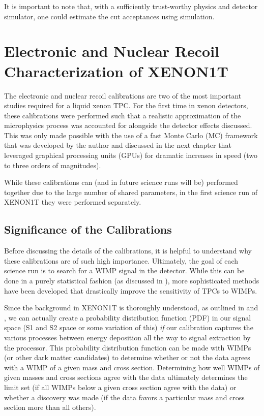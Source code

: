 It is important to note that, with a sufficiently trust-worthy physics and detector simulator, one could estimate the cut acceptances using simulation. 




\section{Electronic and Nuclear Recoil Characterization of XENON1T}
\label{sec:xe1t_er_nr_calibration}

The electronic and nuclear recoil calibrations are two of the most important studies required for a liquid xenon TPC.  For the first time in xenon detectors, these calibrations were performed such that a realistic approximation of the microphysics process was accounted for alongside the detector effects discussed.  This was only made possible with the use of a fast Monte Carlo (MC) framework that was developed by the author and discussed in the next chapter that leveraged graphical processing units (GPUs) for dramatic increases in speed (two to three orders of magnitudes).

While these calibrations can (and in future science runs will be) performed together due to the large number of shared parameters, in the first science run of XENON1T they were performed separately.  


\subsection{Significance of the Calibrations}

Before discussing the details of the calibrations, it is helpful to understand why these calibrations are of such high importance.  Ultimately, the goal of each science run is to search for a WIMP signal in the detector.  While this can be done in a purely statistical fashion (as discussed in ), more sophisticated methods have been developed that drastically improve the sensitivity of TPCs to WIMPs.  

Since the background in XENON1T is thoroughly understood, as outlined in  and , we can actually create a probability distribution function (PDF) in our signal space (S1 and S2 space or some variation of this) \textit{if} our calibration captures the various processes between energy deposition all the way to signal extraction by the processor.  This probability distribution function can be made with WIMPs (or other dark matter candidates) to determine whether or not the data agrees with a WIMP of a given mass and cross section.  Determining how well WIMPs of given masses and cross sections agree with the data ultimately determines the limit set (if all WIMPs below a given cross section agree with the data) or whether a discovery was made (if the data favors a particular mass and cross section more than all others).

